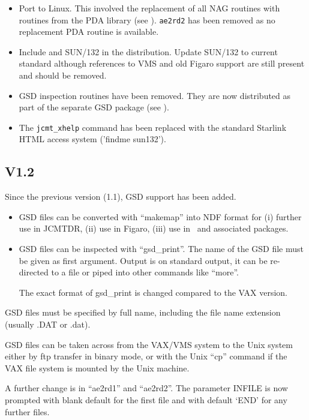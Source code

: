 \documentclass[twoside,11pt,nolof]{starlink}
\providecommand{\Kappa}{\xref{{\sc{Kappa}}}{sun95}{}}
\begin{document}
\begin{itemize}
\item Port to Linux. This involved the replacement of all NAG routines with
  routines from the PDA library (see  \cite{pda}). \texttt{ae2rd2} has been removed
  as no replacement PDA routine is available.
\item Include  and SUN/132 in the distribution. Update SUN/132 to current
  standard although references to VMS and old Figaro support are still present
and should be removed.
\item GSD inspection routines have been removed. They are now distributed as
  part of the separate GSD package (see ).
\item The \texttt{jcmt\_xhelp} command has been replaced with the standard
  Starlink HTML access system ('findme sun132').

\end{itemize}

\subsection*{V1.2}

Since the previous version (1.1), GSD support has been added.
\begin{itemize}
\item GSD files can be converted with ``makemap'' into NDF format for (i)
    further use in JCMTDR, (ii) use in Figaro, (iii) use in \Kappa\ and
    associated packages.

\item GSD files can be inspected with ``gsd\_print''. The name of the GSD
    file must be given as first argument. Output is on standard output,
    it can be re-directed to a file or piped into other commands like
    ``more''.

    The exact format of gsd\_print is changed compared to the VAX
    version.
\end{itemize}

 GSD files must be specified by full name, including the file name
 extension (usually .DAT or .dat).

 GSD files can be taken across from the VAX/VMS system to the Unix
 system either by ftp transfer in binary mode, or with the Unix ``cp''
 command if the VAX file system is mounted by the Unix machine.

 A further change is in ``ae2rd1'' and ``ae2rd2''. The parameter INFILE is
 now prompted with blank default for the first file and with default
 `END' for any further files.
\end{document}
